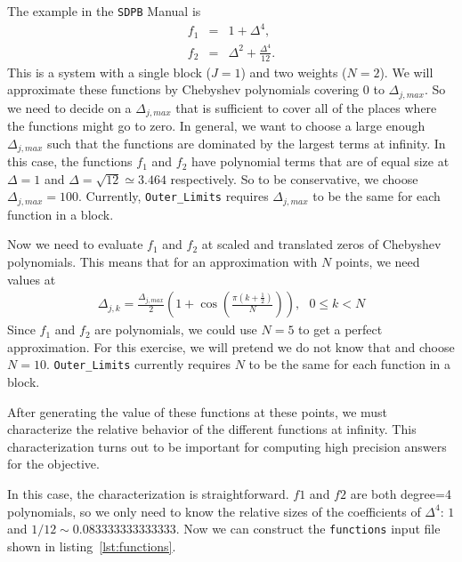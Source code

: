 \documentclass[12pt]{article}
\numberwithin{equation}{section}
\begin{document}
The example in the \texttt{SDPB} Manual is
\begin{eqnarray}
  f_1 & = & 1 + \Delta^4, \\
  f_2 & = & \Delta^2 + \frac{\Delta^4}{12}.
\end{eqnarray}
This is a system with a single block ($J=1$) and two weights ($N=2$).
We will approximate these functions by Chebyshev polynomials covering
$0$ to $\Delta_{j,max}$.  So we need to decide on a $\Delta_{j,max}$
that is sufficient to cover all of the places where the functions
might go to zero.  In general, we want to choose a large enough
$\Delta_{j,max}$ such that the functions are dominated by the largest
terms at infinity.  In this case, the functions $f_1$ and $f_2$ have
polynomial terms that are of equal size at $\Delta=1$ and
$\Delta=\sqrt{12}\simeq 3.464$ respectively.  So to be conservative,
we choose $\Delta_{j,max}=100$.  Currently, \texttt{Outer\_Limits}
requires $\Delta_{j,max}$ to be the same for each function in a block.

Now we need to evaluate $f_1$ and $f_2$ at scaled and translated zeros
of Chebyshev polynomials.  This means that for an approximation with
$N$ points, we need values at
\begin{eqnarray}
\Delta_{j,k} =  \frac{\Delta_{j,max}}{2} \left(1 + \cos\left({\frac{\pi \left( k + \frac{1}{2} \right)}{N}}\right)\right), \textrm{ } 0 \le k < N
\end{eqnarray}
Since $f_1$ and $f_2$ are polynomials, we could use $N=5$ to get a
perfect approximation.  For this exercise, we will pretend we do not
know that and choose $N=10$.  \texttt{Outer\_Limits}
currently requires $N$ to be the same for each function in a block.

After generating the value of these functions at these points, we must
characterize the relative behavior of the different functions at
infinity.  This characterization turns out to be important for
computing high precision answers for the objective.

In this case, the characterization is straightforward.  $f1$ and $f2$
are both degree=4 polynomials, so we only need to know the relative
sizes of the coefficients of $\Delta^4$: $1$ and
$1/12 \sim 0.083333333333333$.  Now we can construct the
\texttt{functions} input file shown in listing~\ref{lst:functions}.
\end{document}
